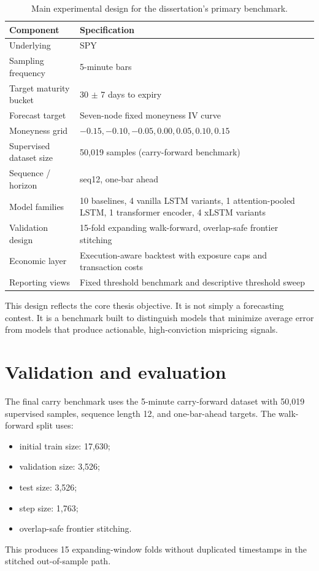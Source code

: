 \documentclass[12pt]{report}
\begin{document}
\begin{table}[H]
\centering
\caption{Main experimental design for the dissertation's primary benchmark.}
\label{tab:design_summary}
\footnotesize
\renewcommand{\arraystretch}{1.15}
\begin{tabularx}{\textwidth}{@{}lY@{}}
\toprule
\textbf{Component} & \textbf{Specification} \\
\midrule
Underlying & SPY \\
Sampling frequency & 5-minute bars \\
Target maturity bucket & 30 \(\pm\) 7 days to expiry \\
Forecast target & Seven-node fixed moneyness IV curve \\
Moneyness grid & \(-0.15,-0.10,-0.05,0.00,0.05,0.10,0.15\) \\
Supervised dataset size & 50,019 samples (carry-forward benchmark) \\
Sequence / horizon & seq12, one-bar ahead \\
Model families & 10 baselines, 4 vanilla LSTM variants, 1 attention-pooled LSTM, 1 transformer encoder, 4 xLSTM variants \\
Validation design & 15-fold expanding walk-forward, overlap-safe frontier stitching \\
Economic layer & Execution-aware backtest with exposure caps and transaction costs \\
Reporting views & Fixed threshold benchmark and descriptive threshold sweep \\
\bottomrule
\end{tabularx}
\end{table}

This design reflects the core thesis objective. It is not simply a forecasting contest. It is a benchmark built to distinguish models that minimize average error from models that produce actionable, high-conviction mispricing signals.


\section{Validation and evaluation}
The final carry benchmark uses the 5-minute carry-forward dataset with 50,019 supervised samples, sequence length 12, and one-bar-ahead targets. The walk-forward split uses:
\begin{itemize}[leftmargin=1.2cm]
    \item initial train size: 17,630;
    \item validation size: 3,526;
    \item test size: 3,526;
    \item step size: 1,763;
    \item overlap-safe frontier stitching.
\end{itemize}
This produces 15 expanding-window folds without duplicated timestamps in the stitched out-of-sample path.
\end{document}
